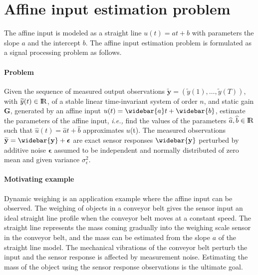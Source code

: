 \section{Affine input estimation problem}

The affine input is modeled as a straight line $u(t) = {a} t + {b}$ with parameters the slope $a$ and the intercept $b$.
The affine input estimation problem is formulated as a signal processing problem as follows. 

\paragraph{Problem} 
Given the sequence of measured output observations $\widetilde{\mathbf{y}} = \left( \widetilde{y}(1),\ldots, \widetilde{y}(T)\right)$, with $\widetilde{y}(t) \in {\rm I\!R}$, of a stable linear time-invariant system of order $n$, and static gain $\mathbf{G}$, generated by an affine input $u(t) = \widebar{a} t + \widebar{b}$, estimate the parameters of the affine input, \textit{i.e.,} find the values of the parameters $\widehat{a}, \widehat{b} \in {\rm I\!R}$ such that $\widehat{u}(t) = \widehat{a} t + \widehat{b}$ approximates $u$(t).
The measured observations $\widetilde{\mathbf{y}} = \widebar{\mathbf{y}} + \bm{\epsilon}$ are exact sensor responses $\widebar{\mathbf{y}}$ perturbed by additive noise  $\bm{\epsilon}$ assumed to be independent and normally distributed of zero mean and given variance $\sigma_{\epsilon}^2$.

\paragraph{Motivating example}
Dynamic weighing is an application example where the affine input can be observed.
The weighing of objects in a conveyor belt gives the sensor input an ideal straight line profile when the conveyor belt moves at a constant speed.
The straight line represents the mass coming gradually into the weighing scale sensor in the conveyor belt, and
the mass can be estimated from the slope $a$ of the straight line model. 
The mechanical vibrations of the conveyor belt perturb the input and the sensor response is affected by measurement noise.
Estimating the mass of the object using the sensor response observations is the ultimate goal.

